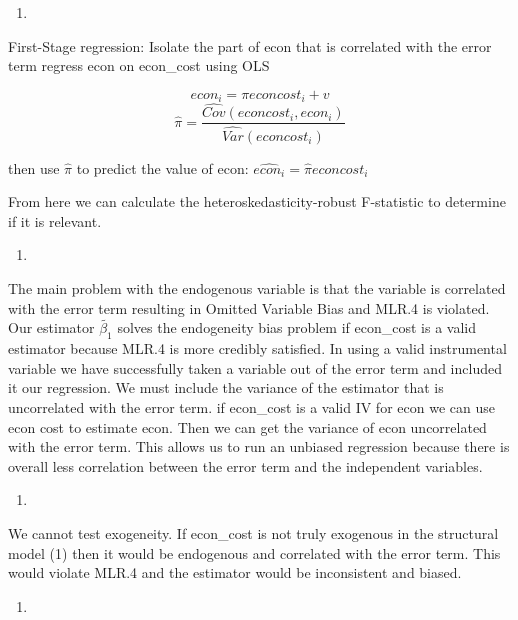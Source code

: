 \documentclass[
  12pt,
  landscape]{article}
\begin{document}
\begin{enumerate}
\def\labelenumi{(\alph{enumi})}
\setcounter{enumi}{4}
\item
\end{enumerate}

First-Stage regression: Isolate the part of econ that is correlated with
the error term regress econ on econ\_cost using OLS

\[
econ_i = \pi econcost_i + v 
\] \[
\hat{\pi} = \frac{\hat{Cov}(econcost_i, econ_i)}{\hat{Var}(econcost_i)}
\]

then use \(\hat{\pi}\) to predict the value of econ:
\(\hat{econ_i} = \hat{\pi} econcost_i\)

From here we can calculate the heteroskedasticity-robust F-statistic to
determine if it is relevant.

\begin{enumerate}
\def\labelenumi{(\alph{enumi})}
\setcounter{enumi}{5}
\item
\end{enumerate}

The main problem with the endogenous variable is that the variable is
correlated with the error term resulting in Omitted Variable Bias and
MLR.4 is violated. Our estimator \(\tilde{\beta_1}\) solves the
endogeneity bias problem if econ\_cost is a valid estimator because
MLR.4 is more credibly satisfied. In using a valid instrumental variable
we have successfully taken a variable out of the error term and included
it our regression. We must include the variance of the estimator that is
uncorrelated with the error term. if econ\_cost is a valid IV for econ
we can use econ cost to estimate econ. Then we can get the variance of
econ uncorrelated with the error term. This allows us to run an unbiased
regression because there is overall less correlation between the error
term and the independent variables.

\begin{enumerate}
\def\labelenumi{(\alph{enumi})}
\setcounter{enumi}{6}
\item
\end{enumerate}

We cannot test exogeneity. If econ\_cost is not truly exogenous in the
structural model (1) then it would be endogenous and correlated with the
error term. This would violate MLR.4 and the estimator would be
inconsistent and biased.

\begin{enumerate}
\def\labelenumi{(\alph{enumi})}
\setcounter{enumi}{7}
\item
\end{enumerate}
\end{document}
